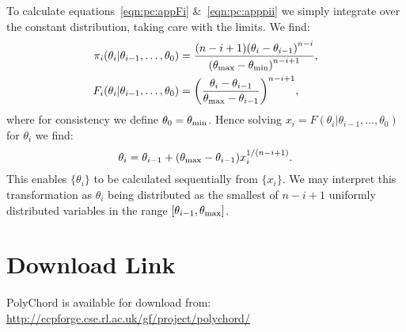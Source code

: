 To calculate equations~\eqref{eqn:pc:appFi} \&~\ref{eqn:pc:apppii} we simply integrate over the constant distribution, taking care with the limits. We find:
\begin{align}
  \pi_i(\theta_i|\theta_{i-1},\ldots,\theta_0) &= \frac{(n-i+1){(\theta_i-\theta_{i-1})}^{n-i}}{{(\theta_{\mathrm{max}}-\theta_{\mathrm{min}})}^{n-i+1}},\\
  F_i(\theta_i|\theta_{i-1},\ldots,\theta_0) &= {\left(\frac{\theta_i-\theta_{i-1}}{\theta_{\mathrm{max}}-\theta_{i-1}}\right)}^{n-i+1},
  \label{eqn:pc:sorted_uniform_calc}
\end{align}
where for consistency we define $\theta_0 = \theta_{\mathrm{min}}$. Hence solving $x_i=F(\theta_i|\theta_{i-1},\ldots,\theta_0)$ for $\theta_i$ we find:
\begin{equation}
  \theta_i = \theta_{i-1}+ (\theta_{\mathrm{max}}-\theta_{i-1})x_i^{1/(n-i+1)}.
  \label{eqn:pc:sorted_uniform_trans}
\end{equation}
This enables $\{\theta_i\}$ to be calculated sequentially from $\{x_i\}$. We may interpret this transformation as $\theta_i$ being distributed as the smallest of $n-i+1$ uniformly distributed variables in the range $[\theta_{i-1},\theta_{\mathrm{max}}]$.







\section*{Download Link}
PolyChord is available for download from:\\ \url{http://ccpforge.cse.rl.ac.uk/gf/project/polychord/}

